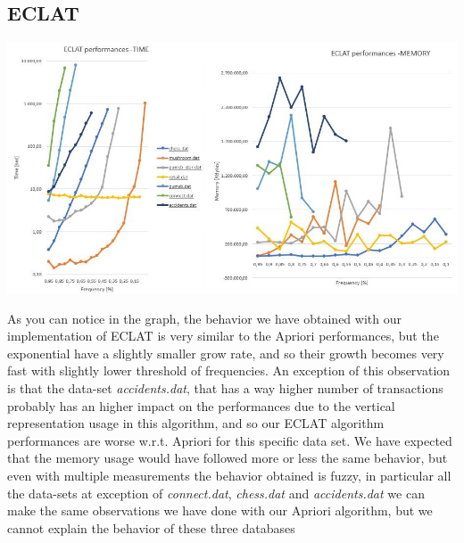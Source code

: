 \documentclass[11pt, a4paper]{article}
\begin{document}
		\subsection{ECLAT}
			\includegraphics[scale =0.7]{ECLAT.JPG}\par\vspace{1cm}
			As you can notice in the graph, the behavior we have obtained with our implementation of ECLAT is very similar to the Apriori performances, but the exponential have a slightly smaller grow rate, and so their growth becomes very fast with slightly lower threshold of frequencies.
			An exception of this observation is that the data-set \textit{accidents.dat}, that has a way higher number of transactions probably has an higher impact on the performances due to the vertical representation usage in this algorithm, and so our ECLAT algorithm performances are worse w.r.t. Apriori for this specific data set.
			We have expected that the memory usage would have followed more or less the same behavior, but even with multiple measurements the behavior obtained is fuzzy, in particular all the data-sets at exception of \textit{connect.dat}, \textit{chess.dat} and \textit{accidents.dat}  we can make the same observations we have done with our Apriori algorithm, but we cannot explain the behavior of these three databases
\end{document}
